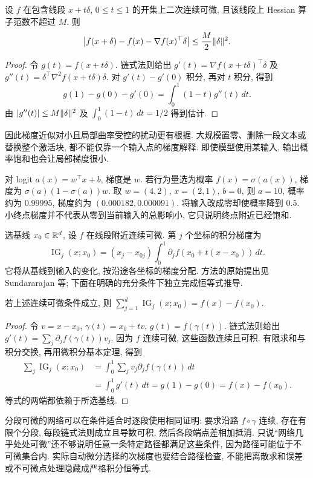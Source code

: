 \begin{proposition}
设 $f$ 在包含线段 $x+t\delta$, $0\le t\le1$ 的开集上二次连续可微, 且该线段上 Hessian 算子范数不超过 $M$. 则
\[
\left|f(x+\delta)-f(x)-\nabla f(x)^\top\delta\right|
\le \frac M2\lVert \delta\rVert^2.
\]
\end{proposition}
\begin{proof}
令 $g(t)=f(x+t\delta)$. 链式法则给出 $g'(t)=\nabla f(x+t\delta)^\top\delta$ 及 $g''(t)=\delta^\top\nabla^2 f(x+t\delta)\delta$. 对 $g'(t)-g'(0)$ 积分, 再对 $t$ 积分, 得到
\[
g(1)-g(0)-g'(0)=\int_0^1(1-t)g''(t)\,dt.
\]
由 $|g''(t)|\le M\lVert \delta\rVert^2$ 及 $\int_0^1(1-t)\,dt=1/2$ 得到估计.
\end{proof}
因此梯度近似对小且局部曲率受控的扰动更有根据. 大规模置零、删除一段文本或替换整个激活块, 都不能仅靠一个输入点的梯度解释. 即使模型使用某输入, 输出概率饱和也会让局部梯度很小.

对 logit $a(x)=w^\top x+b$, 梯度是 $w$. 若行为量选为概率 $f(x)=\sigma(a(x))$, 梯度为 $\sigma(a)(1-\sigma(a))w$. 取 $w=(4,2)$, $x=(2,1)$, $b=0$, 则 $a=10$, 概率约为 $0.99995$, 梯度约为 $(0.000182,0.000091)$. 将输入改成零却使概率降到 $0.5$. 小终点梯度并不代表从零到当前输入的总影响小, 它只说明终点附近已经饱和.

\begin{definition}
选基线 $x_0\in\mathbb R^d$, 设 $f$ 在线段附近连续可微. 第 $j$ 个坐标的积分梯度为
\[
\operatorname{IG}_j(x;x_0)=(x_j-x_{0j})\int_0^1
\partial_j f(x_0+t(x-x_0))\,dt.
\]
它将从基线到输入的变化, 按沿途各坐标的梯度分配. 方法的原始提出见 Sundararajan 等\cite{ig}; 下面在明确的充分条件下独立完成恒等式推导.
\end{definition}
\begin{proposition}[完整性]\label{prop:ig-completeness}
若上述连续可微条件成立, 则 $\sum_{j=1}^d\operatorname{IG}_j(x;x_0)=f(x)-f(x_0)$.
\end{proposition}
\begin{proof}
令 $v=x-x_0$, $\gamma(t)=x_0+tv$, $g(t)=f(\gamma(t))$. 链式法则给出 $g'(t)=\sum_j\partial_jf(\gamma(t))v_j$. 因为 $f$ 连续可微, 这些函数连续且可积. 有限求和与积分交换, 再用微积分基本定理, 得到
\begin{align*}
\sum_j\operatorname{IG}_j(x;x_0)
&=\int_0^1\sum_jv_j\partial_jf(\gamma(t))\,dt\\
&=\int_0^1g'(t)\,dt=g(1)-g(0)=f(x)-f(x_0).
\end{align*}
等式的两端都依赖于所选基线.
\end{proof}
分段可微的网络可以在条件适合时逐段使用相同证明: 要求沿路 $f\circ\gamma$ 连续, 存在有限个分段, 每段链式法则成立且导数可积, 然后各段端点差相加抵消. 只说“网络几乎处处可微”还不够说明任意一条特定路径都满足这些条件, 因为路径可能位于不可微集合内. 实际自动微分选择的次梯度也要结合路径检查, 不能把离散求和误差或不可微点处理隐藏成严格积分恒等式.

